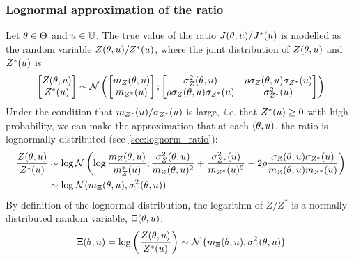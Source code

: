 \documentclass[../../Main_ManuscritThese.tex]{subfiles}
\begin{document}
\subsubsection{Lognormal approximation of the ratio}
Let $\theta\in\Theta$ and $u\in\mathbb{U}$.  The true value of the ratio
$J(\theta,u)/J^*(u)$ is modelled as the random variable
$Z(\theta,u)/Z^*(u)$, where the joint distribution of $Z(\theta, u)$
and $Z^*(u)$ is
\begin{equation}
  \begin{bmatrix}
    Z(\theta, u) \\ Z^*(u)
  \end{bmatrix}
  \sim \mathcal{N}\left(
    \begin{bmatrix}
      m_Z(\theta, u) \\ m_{Z^*}(u)
    \end{bmatrix}
    ;
    \begin{bmatrix}
      \sigma^2_Z(\theta, u) &\rho \sigma_Z(\theta, u)\sigma_{Z^*}(u) \\
      \rho \sigma_Z(\theta, u)\sigma_{Z^*}(u) & \sigma^2_{Z^*}(u) 
    \end{bmatrix}
  \right)
\end{equation}
Under the condition that $m_{Z^*}(u)/\sigma_{Z^*}(u)$ is large,
\textit{i.e.} that $Z^*(u) \geq 0$ with high probability, we can
make the approximation that at each $(\theta, u)$, the ratio is
lognormally distributed (see \cref{sec:lognorm_ratio}):
\begin{align}
  \label{eq:log_ratio_eq}
  \frac{Z(\theta, u)}{Z^*(u)}&\sim \log \mathcal{N}\left(\log\frac{m_Z(\theta, u)}{m_{Z}^*(u)};\frac{\sigma^2_Z(\theta, u)}{m_Z(\theta, u)^2}+\frac{\sigma^2_{Z^*}(u)}{m_{{Z^*}}(u)^2} -  2 \rho \frac{\sigma_Z(\theta,u) \sigma_{Z^*}(u)}{m_{Z}(\theta, u)m_{Z^*}(u)}\right) \\
  &\sim \log\mathcal{N}(m_{\Xi}(\theta, u), \sigma^2_{\Xi}(\theta, u))
\end{align}
By definition of the lognormal distribution, the logarithm of $Z/ Z^*$ is a normally distributed random variable, $\Xi(\theta, u)$:
\begin{equation}
  \label{eq:log_ratio}
  \Xi(\theta,u) =  \log\left(\frac{Z(\theta, u)}{Z^*(u)}\right)\sim \mathcal{N}\left(m_{\Xi}(\theta, u),\sigma_{\Xi}^2(\theta, u)\right)
\end{equation}
\end{document}
